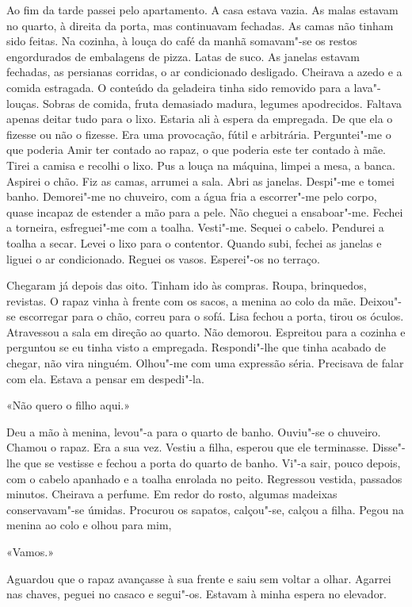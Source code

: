 Ao fim da tarde passei pelo apartamento. A casa estava vazia. As malas
estavam no quarto, à direita da porta, mas continuavam fechadas. As
camas não tinham sido feitas. Na cozinha, à louça do café da manhã
somavam"-se os restos engordurados de embalagens de pizza. Latas de suco.
As janelas estavam fechadas, as persianas corridas, o ar condicionado
desligado. Cheirava a azedo e a comida estragada. O conteúdo da
geladeira tinha sido removido para a lava"-louças. Sobras de comida,
fruta demasiado madura, legumes apodrecidos. Faltava apenas deitar tudo
para o lixo. Estaria ali à espera da empregada. De que ela o fizesse ou
não o fizesse. Era uma provocação, fútil e arbitrária. Perguntei"-me o
que poderia Amir ter contado ao rapaz, o que poderia este ter contado à
mãe. Tirei a camisa e recolhi o lixo. Pus a louça na máquina, limpei a
mesa, a banca. Aspirei o chão. Fiz as camas, arrumei a sala. Abri as
janelas. Despi"-me e tomei banho. Demorei"-me no chuveiro, com a água
fria a escorrer"-me pelo corpo, quase incapaz de estender a mão para a
pele. Não cheguei a ensaboar"-me. Fechei a torneira, esfreguei"-me com a
toalha. Vesti"-me. Sequei o cabelo. Pendurei a toalha a secar. Levei o
lixo para o contentor. Quando subi, fechei as janelas e liguei o ar
condicionado. Reguei os vasos. Esperei"-os no terraço.

Chegaram já depois das oito. Tinham ido às compras. Roupa, brinquedos,
revistas. O rapaz vinha à frente com os sacos, a menina ao colo da mãe.
Deixou"-se escorregar para o chão, correu para o sofá. Lisa fechou a
porta, tirou os óculos. Atravessou a sala em direção ao quarto. Não
demorou. Espreitou para a cozinha e perguntou se eu tinha visto a
empregada. Respondi"-lhe que tinha acabado de chegar, não vira ninguém.
Olhou"-me com uma expressão séria. Precisava de falar com ela. Estava a
pensar em despedi"-la.

«Não quero o filho aqui.»

Deu a mão à menina, levou"-a para o quarto de banho. Ouviu"-se o
chuveiro. Chamou o rapaz. Era a sua vez. Vestiu a filha, esperou que ele
terminasse. Disse"-lhe que se vestisse e fechou a porta do quarto de
banho. Vi"-a sair, pouco depois, com o cabelo apanhado e a toalha
enrolada no peito. Regressou vestida, passados minutos. Cheirava a
perfume. Em redor do rosto, algumas madeixas conservavam"-se úmidas.
Procurou os sapatos, calçou"-se, calçou a filha. Pegou na menina ao colo
e olhou para mim,

«Vamos.»

Aguardou que o rapaz avançasse à sua frente e saiu sem voltar a olhar.
Agarrei nas chaves, peguei no casaco e segui"-os. Estavam à minha espera
no elevador.

